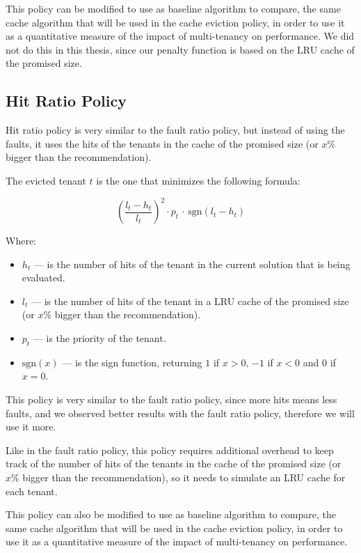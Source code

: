 This policy can be modified to use as baseline algorithm to compare, the same cache algorithm
that will be used in the cache eviction policy, in order to use it as a quantitative measure 
of the impact of multi-tenancy on performance. We did not do this in this thesis, since
our penalty function is based on the LRU cache of the promised size.

\subsection{Hit Ratio Policy}

Hit ratio policy is very similar to the fault ratio policy, but instead of using the faults,
it uses the hits of the tenants in the cache of the promised size (or $x\%$ bigger than the recommendation).

The evicted tenant $t$ is the one that minimizes the following formula:

$$
\left( \frac{l_t - h_t}{l_t} \right) ^2 \cdot p_t \, \cdot \, \text{sgn}( l_t - h_t )
$$

Where:

\begin{itemize}
    \item $h_t$ --- is the number of hits of the tenant in the current solution that is being evaluated.
    \item $l_t$ --- is the number of hits of the tenant in a LRU cache of the promised size (or $x\%$ bigger than the recommendation).
    \item $p_t$ --- is the priority of the tenant.
    \item $\text{sgn}(x)$ --- is the sign function, returning $1$ if $x > 0$, $-1$ if $x < 0$ and $0$ if $x = 0$.
\end{itemize}

This policy is very similar to the fault ratio policy, since more hits means less faults,
and we observed better results with the fault ratio policy, therefore we will use it more.

Like in the fault ratio policy, this policy requires additional overhead to keep track of the
number of hits of the tenants in the cache of the promised size (or $x\%$ bigger than the recommendation),
so it needs to simulate an LRU cache for each tenant.

This policy can also be modified to use as baseline algorithm to compare, the same cache algorithm
that will be used in the cache eviction policy, in order to use it as a quantitative measure
of the impact of multi-tenancy on performance.

